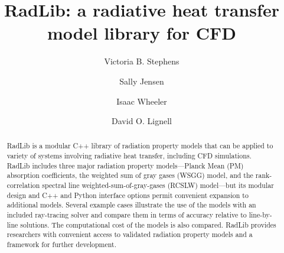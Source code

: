 \documentclass[preprint,12pt]{elsarticle}
\begin{document}
\begin{frontmatter}



\title{RadLib: a radiative heat transfer model library for CFD}




\author{Victoria B. Stephens}
\author{Sally Jensen}
\author{Isaac Wheeler}
\author{David O. Lignell}


\address{Department of Chemical Engineering, Brigham Young University, Provo, UT 84602, United States}

\begin{abstract}
RadLib is a modular C++ library of radiation property models that can be applied to variety of systems involving radiative heat transfer, including CFD simulations. RadLib includes three major radiation property models---Planck Mean (PM) absorption coefficients, the weighted sum of gray gases (WSGG) model, and the rank-correlation spectral line weighted-sum-of-gray-gases (RCSLW) model---but its modular design and C++ and Python interface options permit convenient expansion to additional models. Several example cases illustrate the use of the models with an included ray-tracing solver and compare them in terms of accuracy relative to line-by-line solutions. The computational cost of the models is also compared. RadLib provides researchers with convenient access to validated radiation property models and a framework for further development. 
\end{abstract}



\end{frontmatter}
\end{document}
